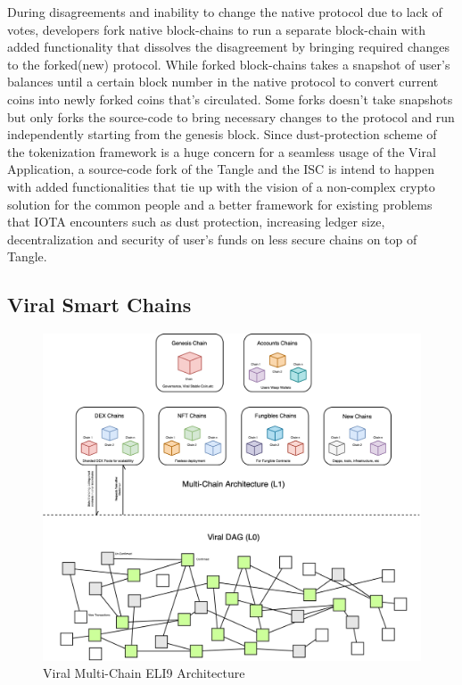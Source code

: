 \documentclass[10pt]{article}
\begin{document}
During disagreements and inability to change the native protocol due to lack of votes, developers fork native block-chains to run a separate block-chain with added functionality that dissolves the disagreement by bringing required changes to the forked(new) protocol. While forked block-chains takes a snapshot of user's balances until a certain block number in the native protocol to convert current coins into newly forked coins that's circulated. Some forks doesn't take snapshots but only forks the source-code to bring necessary changes to the protocol and run independently starting from the genesis block. Since dust-protection scheme of the tokenization framework is a huge concern for a seamless usage of the Viral Application, a source-code fork of the Tangle and the ISC is intend to happen with added functionalities that tie up with the vision of a non-complex crypto solution for the common people and a better framework for existing problems that IOTA encounters such as dust protection, increasing ledger size, decentralization and security of user's funds on less secure chains on top of Tangle.











\subsection{Viral Smart Chains}

\begin{figure}[H]
\includegraphics[width=\textwidth]{Architecture}
\caption{Viral Multi-Chain ELI9 Architecture}
\end{figure}
\end{document}
